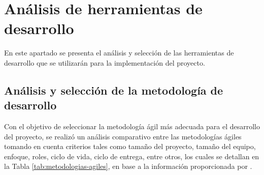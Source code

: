 \section{Análisis de herramientas de desarrollo}
En este apartado se presenta el análisis y selección de las herramientas de desarrollo que se utilizarán para la
implementación del proyecto.

\subsection{Análisis y selección de la metodología de desarrollo}



% 

Con el objetivo de seleccionar la metodología ágil más adecuada para el desarrollo del proyecto, se realizó un
análisis comparativo entre las metodologías ágiles tomando en cuenta criterios tales como tamaño del proyecto,
tamaño del equipo, enfoque, roles, ciclo de vida, ciclo de entrega, entre otros, los cuales se detallan en
la Tabla \ref{tab:metodologias-agiles}, en base a la información proporcionada por \cite{remacheganayAPLICATIVOWEBUTILIZANDO}.





